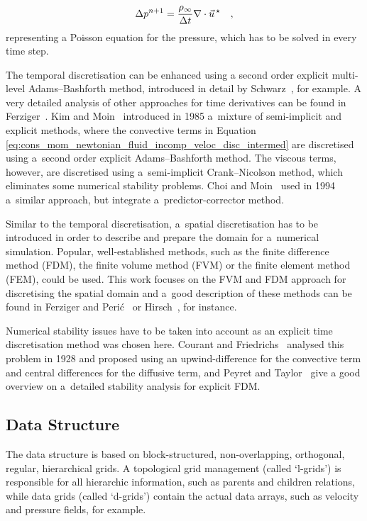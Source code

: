 \documentclass[10pt, conference, compsocconf]{IEEEtran}
\begin{document}
\begin{equation}
\label{eq:cons_mom_newtonian_fluid_incomp_press_disc_poisson}
\Delta p^{n+1} = \frac{\rho_\infty}{\Delta t} \nabla \cdot \vec u^{\,\star} \quad ,\vspace{6pt}
\end{equation}
representing a Poisson equation for the pressure, which has to be solved in every time step.

The temporal discretisation can be enhanced using a second order explicit multi-level Adams--Bashforth method, introduced in detail by Schwarz~\cite{Schwarz2011}, for example. A very detailed analysis of other approaches for time derivatives can be found in Ferziger~\cite{Ferziger1998}. Kim and Moin~\cite{Kim1985} introduced in 1985 a~mixture of semi-implicit and explicit methods, where the convective terms in Equation \eqref{eq:cons_mom_newtonian_fluid_incomp_veloc_disc_intermed} are discretised using a~second order explicit Adams--Bashforth method. The viscous terms, however, are discretised using a~semi-implicit Crank--Nicolson method, which eliminates some numerical stability problems. Choi and Moin~\cite{ChoiMoin1994} used in 1994 a~similar approach, but integrate a~predictor-corrector method.

Similar to the temporal discretisation, a~spatial discretisation has to be introduced in order to describe and prepare the domain for a~numerical simulation. Popular, well-established methods, such as the finite difference method (FDM), the finite volume method (FVM) or the finite element method (FEM), could be used. This work focuses on the FVM and FDM approach for discretising the spatial domain and a~good description of these methods can be found in Ferziger and Peri\'c~\cite{Ferziger2002} or Hirsch~\cite{Hirsch2007}, for instance.

Numerical stability issues have to be taken into account as an explicit time discretisation method was chosen here. Courant and Friedrichs~\cite{CFL1928} analysed this problem in 1928 and proposed using an upwind-difference for the convective term and central differences for the diffusive term, and Peyret and Taylor~\cite{Peyret1983} give a good overview on a~detailed stability analysis for explicit FDM.

\subsection{Data Structure}

The data structure is based on block-structured, non-overlapping, orthogonal, regular, hierarchical grids. A topological grid management (called `l-grids') is responsible for all hierarchic information, such as parents and children relations, while data grids (called `d-grids') contain the actual data arrays, such as velocity and pressure fields, for example.
\end{document}
